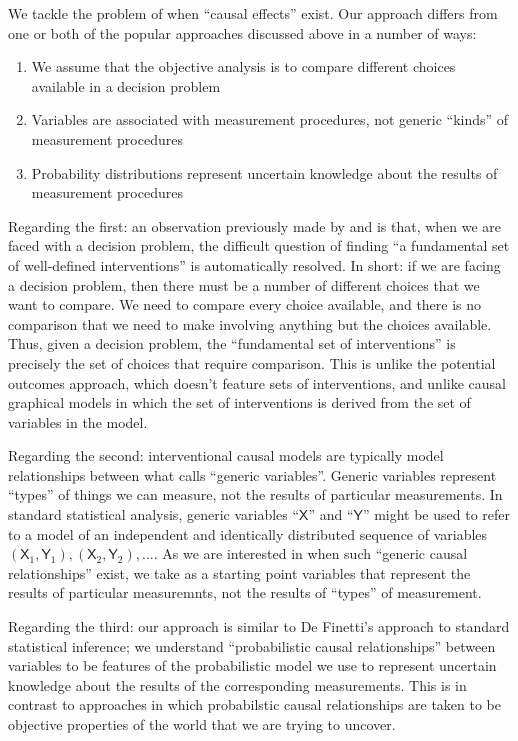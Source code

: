 \documentclass{article}
\theoremstyle{plain}
\theoremstyle{definition}
\newcommand{\RV}[1]{\ensuremath{\mathsf{#1}}}
\begin{document}
We tackle the problem of when ``causal effects'' exist. Our approach differs from one or both of the popular approaches discussed above in a number of ways:

\begin{enumerate}
  \item We assume that the objective analysis is to compare different choices available in a decision problem
  \item Variables are associated with measurement procedures, not generic ``kinds'' of measurement procedures
  \item Probability distributions represent uncertain knowledge about the results of measurement procedures
\end{enumerate}

Regarding the first: an observation previously made by \citet{dawid_decision-theoretic_2020} and \citet{heckerman_decision-theoretic_1995} is that, when we are faced with a decision problem, the difficult question of finding ``a fundamental set of well-defined interventions'' is automatically resolved. In short: if we are facing a decision problem, then there must be a number of different choices that we want to compare. We need to compare every choice available, and there is no comparison that we need to make involving anything but the choices available. Thus, given a decision problem, the ``fundamental set of interventions'' is precisely the set of choices that require comparison. This is unlike the potential outcomes approach, which doesn't feature sets of interventions, and unlike causal graphical models in which the set of interventions is derived from the set of variables in the model.

Regarding the second: interventional causal models are typically model relationships between what \citet{dawid_decision-theoretic_2020} calls ``generic variables''. Generic variables represent ``types'' of things we can measure, not the results of particular measurements. In standard statistical analysis, generic variables ``$\RV{X}$'' and ``$\RV{Y}$'' might be used to refer to a model of an independent and identically distributed sequence of variables $(\RV{X}_1,\RV{Y}_1),(\RV{X}_2,\RV{Y}_2),...$. As we are interested in when such ``generic causal relationships'' exist, we take as a starting point variables that represent the results of particular measuremnts, not the results of ``types'' of measurement.

Regarding the third: our approach is similar to De Finetti's approach to standard statistical inference; we understand ``probabilistic causal relationships'' between variables to be features of the probabilistic model we use to represent uncertain knowledge about the results of the corresponding measurements. This is in contrast to approaches in which probabilstic causal relationships are taken to be objective properties of the world that we are trying to uncover. 
\end{document}
